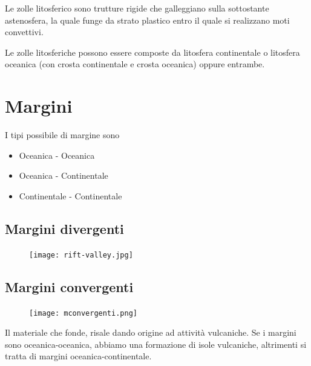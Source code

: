 \documentclass[a4paper]{article}
\begin{document}
Le zolle litosferico sono trutture rigide che galleggiano sulla sottostante astenosfera,
la quale funge da strato plastico entro il quale si realizzano moti convettivi.

Le zolle litosferiche possono essere composte da litosfera continentale o litosfera oceanica
(con crosta continentale e crosta oceanica) oppure entrambe.

\section{Margini}

I tipi possibile di margine sono
\begin{itemize}
    \item Oceanica - Oceanica
    \item Oceanica - Continentale
    \item Continentale - Continentale
\end{itemize}


\pagebreak

\subsection{Margini divergenti}


\begin{figure}[h]
    \centering
    \texttt{[image: rift-valley.jpg]}
\end{figure}

\pagebreak

\subsection{Margini convergenti}


\begin{figure}[h]
    \centering
    \texttt{[image: mconvergenti.png]}
\end{figure}

Il materiale che fonde, risale dando origine ad attività vulcaniche.
Se i margini sono oceanica-oceanica, abbiamo una formazione di isole vulcaniche,
altrimenti si tratta di margini oceanica-continentale.
\end{document}
